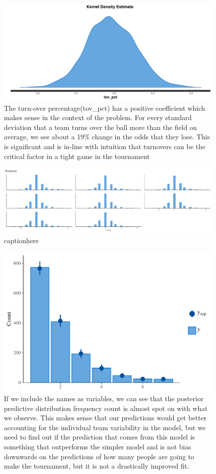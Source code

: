 \documentclass[10pt,a4paper, hidelinks]{article} %
\begin{document}
\begin{figure}[H]
	\centering
	\includegraphics[width=0.7\linewidth]{../fig/polr_tovpct}
	\caption{The turn-over percentage(tov\_pct) has a positive coefficient which makes sense in the context of the problem. For every standard deviation that a team turns over the ball more than the field on average, we see about a 19\% change in the odds that they lose. This is significant and is in-line with intuition that turnovers can be the critical factor in a tight game in the tournament}
	\label{fig:polrtovpct}
\end{figure}

\begin{figure}[H]
	\centering
	\includegraphics[width=1\linewidth]{../fig/polr_residuals}
	\caption{captionhere}
	\label{fig:residuals}
\end{figure}


\begin{figure}[H]
	\centering
	\includegraphics[width=0.7\linewidth]{../fig/polr_name_pp}
	\caption{If we include the names as variables, we can see that the posterior predictive distribution frequency count is almost spot on with what we observe. This makes sense that our predictions would get better accounting for the individual team variability in the model, but we need to find out if the prediction that comes from this model is something that outperforms the simpler model and is not bias downwards on the predictions of how many people are going to make the tournament, but it is not a drastically improved fit.}
	\label{fig:polrnamepp}
\end{figure}
\end{document}
